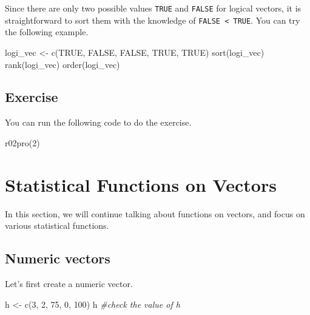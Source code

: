 \documentclass[
]{book}
\newenvironment{Shaded}{\begin{snugshade}}{\end{snugshade}}
\newcommand{\CommentTok}[1]{\textcolor[rgb]{0.56,0.35,0.01}{\textit{#1}}}
\newcommand{\ConstantTok}[1]{\textcolor[rgb]{0.00,0.00,0.00}{#1}}
\newcommand{\DecValTok}[1]{\textcolor[rgb]{0.00,0.00,0.81}{#1}}
\newcommand{\FunctionTok}[1]{\textcolor[rgb]{0.00,0.00,0.00}{#1}}
\newcommand{\NormalTok}[1]{#1}
\newcommand{\OtherTok}[1]{\textcolor[rgb]{0.56,0.35,0.01}{#1}}
\begin{document}
Since there are only two possible values \texttt{TRUE} and \texttt{FALSE} for logical vectors, it is straightforward to sort them with the knowledge of \texttt{FALSE\ \textless{}\ TRUE}. You can try the following example.

\begin{Shaded}
\begin{Highlighting}[]
\NormalTok{logi\_vec }\OtherTok{\textless{}{-}} \FunctionTok{c}\NormalTok{(}\ConstantTok{TRUE}\NormalTok{, }\ConstantTok{FALSE}\NormalTok{, }\ConstantTok{FALSE}\NormalTok{, }\ConstantTok{TRUE}\NormalTok{, }\ConstantTok{TRUE}\NormalTok{)}
\FunctionTok{sort}\NormalTok{(logi\_vec)}
\FunctionTok{rank}\NormalTok{(logi\_vec)}
\FunctionTok{order}\NormalTok{(logi\_vec)}
\end{Highlighting}
\end{Shaded}

\hypertarget{exercise-4}{%
\subsection{Exercise}\label{exercise-4}}

You can run the following code to do the exercise.

\begin{Shaded}
\begin{Highlighting}[]
\FunctionTok{r02pro}\NormalTok{(}\DecValTok{2}\NormalTok{)}
\end{Highlighting}
\end{Shaded}

\hypertarget{vector-functions}{%
\section{Statistical Functions on Vectors}\label{vector-functions}}

In this section, we will continue talking about functions on vectors, and focus on various statistical functions.

\hypertarget{numeric-vectors-1}{%
\subsection{Numeric vectors}\label{numeric-vectors-1}}

Let's first create a numeric vector.

\begin{Shaded}
\begin{Highlighting}[]
\NormalTok{h }\OtherTok{\textless{}{-}} \FunctionTok{c}\NormalTok{(}\DecValTok{3}\NormalTok{, }\DecValTok{2}\NormalTok{, }\DecValTok{75}\NormalTok{, }\DecValTok{0}\NormalTok{, }\DecValTok{100}\NormalTok{)}
\NormalTok{h }\CommentTok{\#check the value of h}
\end{Highlighting}
\end{Shaded}
\end{document}
